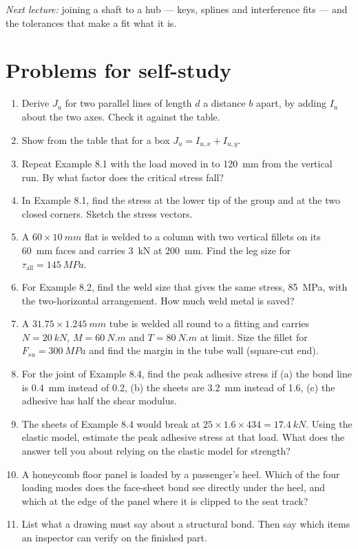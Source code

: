 \documentclass[11pt,a4paper]{article}
\begin{document}
\noindent \emph{Next lecture:} joining a shaft to a hub --- keys, splines and interference fits ---
and the tolerances that make a fit what it is.

\section{Problems for self-study}

\begin{enumerate}[nosep,leftmargin=1.5em]
  \item Derive $J_u$ for two parallel lines of length $d$ a distance $b$ apart, by adding $I_u$
        about the two axes. Check it against the table.
  \item Show from the table that for a box $J_u=I_{u,x}+I_{u,y}$.
  \item Repeat Example 8.1 with the load moved in to \SI{120}{mm} from the vertical run. By what
        factor does the critical stress fall?
  \item In Example 8.1, find the stress at the lower tip of the group and at the two closed
        corners. Sketch the stress vectors.
  \item A $60\times\SI{10}{mm}$ flat is welded to a column with two vertical fillets on its
        \SI{60}{mm} faces and carries \SI{3}{kN} at \SI{200}{mm}. Find the leg size for
        $\tau_{\text{all}}=\SI{145}{MPa}$.
  \item For Example 8.2, find the weld size that gives the same stress, \SI{85}{MPa}, with the
        two-horizontal arrangement. How much weld metal is saved?
  \item A $31.75\times\SI{1.245}{mm}$ tube is welded all round to a fitting and carries
        $N=\SI{20}{kN}$, $M=\SI{60}{N.m}$ and $T=\SI{80}{N.m}$ at limit. Size the fillet for
        $F_{su}=\SI{300}{MPa}$ and find the margin in the tube wall (square-cut end).
  \item For the joint of Example 8.4, find the peak adhesive stress if (a) the bond line is
        \SI{0.4}{mm} instead of 0.2, (b) the sheets are \SI{3.2}{mm} instead of 1.6, (c) the
        adhesive has half the shear modulus.
  \item The sheets of Example 8.4 would break at $25\times1.6\times434=\SI{17.4}{kN}$. Using the
        elastic model, estimate the peak adhesive stress at that load. What does the answer tell
        you about relying on the elastic model for strength?
  \item A honeycomb floor panel is loaded by a passenger's heel. Which of the four loading modes
        does the face-sheet bond see directly under the heel, and which at the edge of the panel
        where it is clipped to the seat track?
  \item List what a drawing must say about a structural bond. Then say which items an inspector
        can verify on the finished part.
\end{enumerate}
\end{document}
